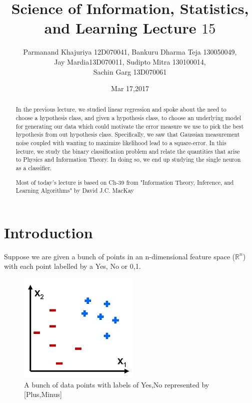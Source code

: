 \documentclass{article}%
\begin{document}
\title{Science of Information, Statistics, and Learning Lecture $15$} %
\author{Parmanand Khajuriya 12D070041, Bankuru Dharma Teja 130050049,\\
 Jay Mardia13D070011, Sudipto Mitra 130100014,\\ 
 Sachin Garg 13D070061
}
\date{Mar 17,2017}
\maketitle
 
\begin{abstract}
In the previous lecture, we studied linear regression and spoke about the need to choose a hypothesis class, and given a hypothesis class, to choose an underlying model for generating our data which could motivate the error measure we use to pick the best hypothesis from out hypothesis class. Specifically, we saw that Gaussian measurement noise coupled with wanting to maximize likelihood lead to a square-error. In this lecture, we study the binary classification problem and relate the quantities that arise to Physics and Information Theory. In doing so, we end up studying the single neuron as a classifier.

Most of today's lecture is based on Ch-39 from "Information Theory, Inference, and Learning Algorithms" by David J.C. MacKay
\end{abstract}

\section*{Introduction}
Suppose we are given a bunch of points in an n-dimensional feature space ($\mathbb{R}^n$) with each point labelled by a {Yes, No} or {0,1}.

\begin{figure}[H]
	\centering
		\includegraphics[scale=0.37]{BinaryClassification.png}
   	\caption{A bunch of data points with labels of {Yes,No} represented by [Plus,Minus]}
\end{figure}
\end{document}
